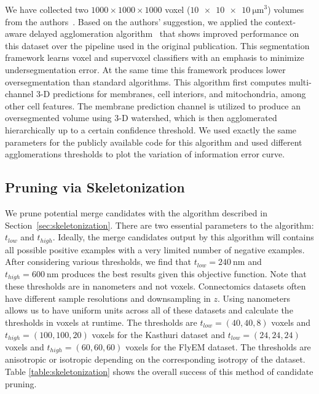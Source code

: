 We have collected two $1000 \times 1000 \times 1000$ voxel ($\SI[product-units=single]{10x10x10}{\micro\meter}^3$) volumes from the authors~\cite{takemura2017connectome}. 
Based on the authors' suggestion, we applied the context-aware delayed agglomeration algorithm~\cite{10.1371/journal.pone.0125825} that shows improved performance on this dataset over the pipeline used in the original publication. 
This segmentation framework learns voxel and supervoxel classifiers with an emphasis to minimize undersegmentation error.
At the same time this framework produces lower oversegmentation than standard algorithms. 
This algorithm first computes multi-channel 3-D predictions for membranes, cell interiors, and mitochondria, among other cell features. 
The membrane prediction channel is utilized to produce an oversegmented volume using 3-D watershed, which is then agglomerated hierarchically up to a certain confidence threshold. 
We used exactly the same parameters for the publicly available code for this algorithm and used different agglomerations thresholds to plot the variation of information error curve.

\subsection{Pruning via Skeletonization}

We prune potential merge candidates with the algorithm described in Section~\ref{sec:skeletonization}. 
There are two essential parameters to the algorithm: $t_{low}$ and $t_{high}$. 
Ideally, the merge candidates output by this algorithm will contains all possible positive examples with a very limited number of negative examples. 
After considering various thresholds, we find that $t_{low} = \SI{240}{\nano\meter}$ and $t_{high} = \SI{600}{\nano\meter}$ produces the best results given this objective function. 
Note that these thresholds are in nanometers and not voxels. 
Connectomics datasets often have different sample resolutions and downsampling in $z$. 
Using nanometers allows us to have uniform units across all of these datasets and calculate the thresholds in voxels at runtime. 
The thresholds are $t_{low} = (40, 40, 8)$ voxels and $t_{high} = (100, 100, 20)$ voxels for the Kasthuri dataset and $t_{low} = (24, 24, 24)$ voxels and $t_{high} = (60, 60, 60)$ voxels for the FlyEM dataset.
The thresholds are anisotropic or isotropic depending on the corresponding isotropy of the dataset.
Table \ref{table:skeletonization} shows the overall success of this method of candidate pruning.

